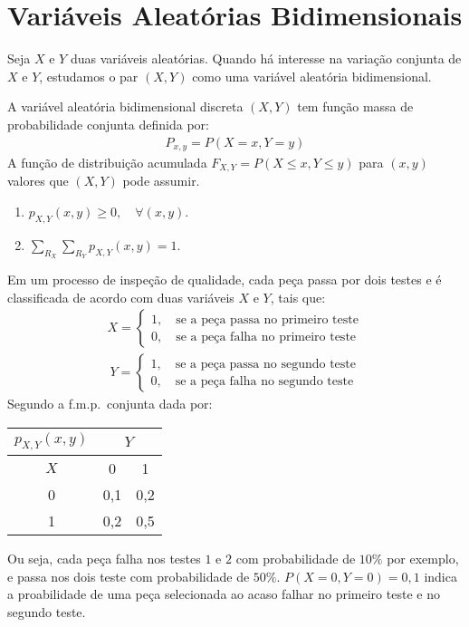 \section{Variáveis Aleatórias Bidimensionais}
\begin{description}
  \item Seja $X$ e $Y$ duas variáveis aleatórias. Quando há interesse na variação conjunta de $X$ e $Y$, estudamos o par $(X,Y)$ como uma variável aleatória bidimensional. 
  \item  [Definição] A variável aleatória bidimensional discreta $(X,Y)$ tem função massa de probabilidade conjunta definida por:
    \begin{align}
      P_{x,y}= P(X=x, Y=y)
    \end{align}
    A função de distribuição acumulada $F_{X,Y} = P(X \leq x, Y \leq y)$ para $(x,y)$ valores que $(X,Y)$ pode assumir.
  \item [Propriedades] \hfill
    \begin{enumerate}[label=(\alph*)]
      \item $p_{X,Y}(x,y) \geq 0, \quad \forall (x,y)$.
      \item $\displaystyle \sum \limits_{R_X} \sum \limits_{R_Y} p_{X,Y} (x,y) = 1$.
    \end{enumerate}
    \begin{example}Em um processo de inspeção de qualidade, cada peça passa por dois testes e é classificada de acordo com duas variáveis $X$ e $Y$, tais que:
      \begin{align*}
        X= \begin{cases}
          1,\quad \text{se a peça passa no primeiro teste}  \\
          0, \quad \text{se a peça falha no primeiro teste}
        \end{cases} 
      \end{align*}
      \begin{align*}
        Y= \begin{cases}
          1,\quad \text{se a peça passa no segundo teste}  \\
          0, \quad \text{se a peça falha no segundo teste}
        \end{cases} 
      \end{align*}
      Segundo a f.m.p.\ conjunta dada por: 
      \begin{table}[H]
      \centering
        \begin{tabular}{c c c}
          $p_{X,Y}(x,y)$ & \multicolumn{2}{c}{$Y$} \\ \midrule
          $X$ & 0 &1  \\\midrule
          0 & 0{,}1&0{,}2 \\
          1 & 0{,}2& 0{,}5 
        \end{tabular} 
      \end{table}
        Ou seja, cada peça falha nos testes $1$ e $2$ com probabilidade de $10\%$ por exemplo, e passa nos dois teste com probabilidade de $50\%$.
      $P\left(X=0, Y=0\right)=0,1$ indica a proabilidade de uma peça selecionada ao acaso falhar no primeiro teste e no segundo teste.
  \end{example}
  \end{description}
